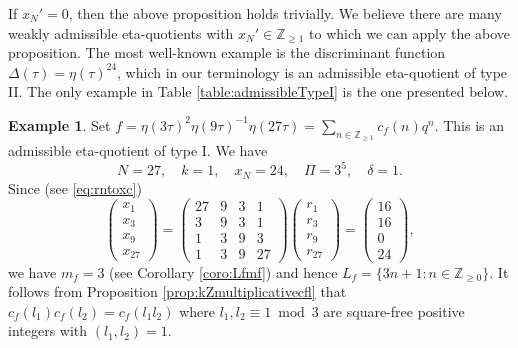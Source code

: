 \documentclass[12pt]{amsart}
\numberwithin{equation}{section}
\theoremstyle{plain}
\theoremstyle{definition}
\newtheorem{examp}[thm]{Example}
\theoremstyle{remark}
\newcommand\numgeq[2]{\mathbb{#1}_{\geq #2}}
\begin{document}
If $x_N'=0$, then the above proposition holds trivially. We believe there are many weakly admissible eta-quotients with $x_N'\in\numgeq{Z}{1}$ to which we can apply the above proposition. The most well-known example is the discriminant function $\Delta(\tau)=\eta(\tau)^{24}$, which in our terminology is an admissible eta-quotient of type II. The only example in Table \ref{table:admissibleTypeI} is the one presented below.
\begin{examp}
\label{examp:level27Multi}
Set $f=\eta(3\tau)^2\eta(9\tau)^{-1}\eta(27\tau)=\sum_{n\in\numgeq{Z}{1}}c_f(n)q^n$. This is an admissible eta-quotient of type I. We have
\begin{equation*}
N=27,\quad k=1,\quad x_N=24,\quad\varPi=3^5,\quad\delta=1.
\end{equation*}
Since (see \eqref{eq:rntoxc})
\begin{equation*}
\begin{pmatrix}
x_1 \\ x_3 \\ x_9 \\ x_{27}
\end{pmatrix}=
\begin{pmatrix}
27 & 9 & 3 & 1 \\
3  & 9 & 3 & 1 \\
1 & 3 & 9 & 3 \\
1 & 3 & 9 & 27
\end{pmatrix}
\begin{pmatrix}
r_1 \\ r_3 \\ r_9 \\ r_{27}
\end{pmatrix}=
\begin{pmatrix}
16 \\ 16 \\ 0 \\ 24
\end{pmatrix},
\end{equation*}
we have $m_f=3$ (see Corollary \ref{coro:Lfmf}) and hence $L_f=\{3n+1\colon n\in\numgeq{Z}{0}\}$. It follows from Proposition \ref{prop:kZmultiplicativecfl} that $c_f(l_1)c_f(l_2)=c_f(l_1l_2)$ where $l_1,l_2\equiv1\bmod{3}$ are square-free positive integers with $(l_1,l_2)=1$.
\end{examp}
\end{document}
